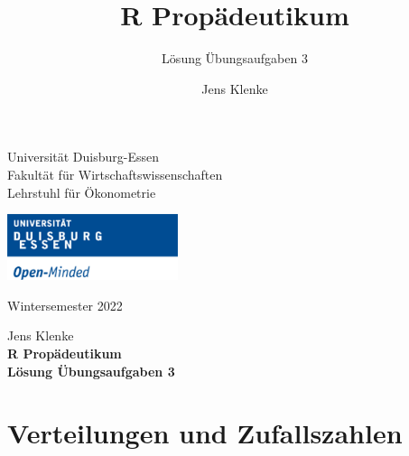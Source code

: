 \documentclass[12pt,a4paper]{article}
\title{R Propädeutikum}
\subtitle{Lösung Übungsaufgaben 3}
\author{Jens Klenke}
\date{}
\begin{document}





\restoregeometry



\begin{minipage}{0.6\textwidth}
Universität Duisburg-Essen\\
Fakultät für Wirtschaftswissenschaften\\
Lehrstuhl für Ökonometrie\\
\end{minipage}

	\begin{flushright}
	\vspace{-3cm}
	\includegraphics*[width=5cm]{includes/duelogo_en.png}\\
	\vspace{.125cm}
	\end{flushright}
\hspace{-0.005cm}Wintersemester 2022

\vspace{0.05cm}

\begin{center}
	\vspace{.25cm}
	Jens Klenke \hspace{.5cm}  \\
	\vspace{.25cm}
	\textbf{\Large{R Propädeutikum}}\\
	\vspace{.25cm}
	\textbf{\large{Lösung Übungsaufgaben 3}}\\
	\vspace{.125cm}
\end{center}





\hypertarget{verteilungen-und-zufallszahlen}{%
\section{Verteilungen und
Zufallszahlen}\label{verteilungen-und-zufallszahlen}}
\end{document}
